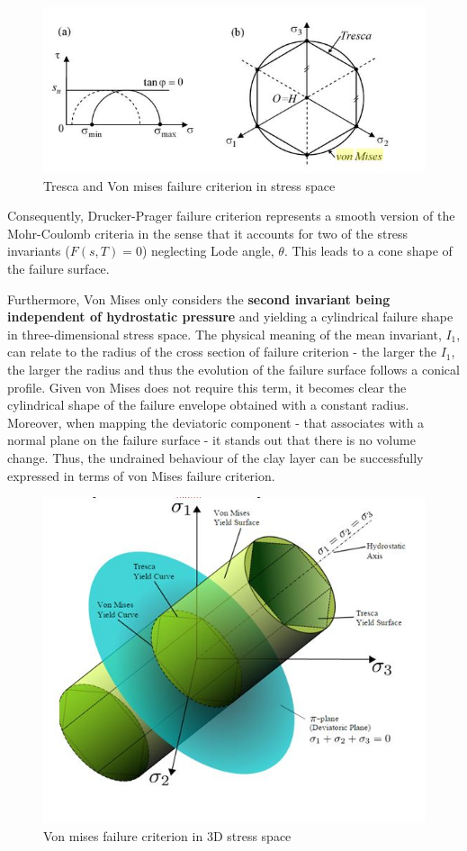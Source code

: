 \documentclass[11pt,a4paper]{report}
\begin{document}
\begin{figure}[h!]
	\centering
	\includegraphics[width=0.8\linewidth]{"tresca"}
	\caption{Tresca and Von mises failure criterion in stress space}
	\label{tresca}
\end{figure}

Consequently, Drucker-Prager failure criterion represents a smooth version of the Mohr-Coulomb criteria in the sense that it accounts for two of the stress invariants ($F (s, T) = 0$) neglecting Lode angle, $\theta$. This leads to a cone shape of the failure surface. 

Furthermore, Von Mises only considers the \textbf{second invariant being independent of hydrostatic pressure }and yielding a cylindrical failure shape in three-dimensional stress space. The physical meaning of the mean invariant, $I_1$, can relate to the radius of the cross section of failure criterion - the larger the $I_1$, the larger the radius and thus the evolution of the failure surface follows a conical profile. Given von Mises does not require this term,  it becomes clear the cylindrical shape of the failure envelope obtained with a constant radius. Moreover, when mapping the deviatoric component - that associates with a normal plane on the failure surface - it stands out that there is no volume change. Thus, the undrained behaviour of the clay layer can be successfully expressed in terms of von Mises failure criterion. 

\begin{figure}[h!]
	\centering
	\includegraphics[width=0.8\linewidth]{"Mises"}
	\caption{Von mises failure criterion in 3D stress space}
	\label{Mises}
\end{figure}
\end{document}
